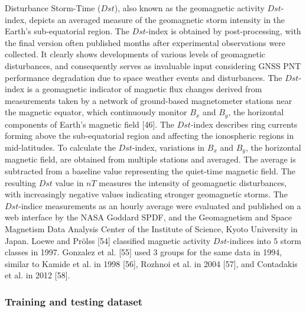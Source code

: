 \let\LaTeXcline\cline\documentclass[sn-mathphys-num]{sn-jnl}\let\cline\LaTeXcline
\begin{document}
Disturbance Storm-Time ($Dst$), also known as the geomagnetic activity $Dst$-index, depicts an averaged measure of the geomagnetic storm intensity in the Earth's sub-equatorial region. The $Dst$-index is obtained by post-processing, with the final version often published months after experimental observations were collected. It clearly shows developments of various levels of geomagnetic disturbances, and consequently serves as invaluable input considering GNSS PNT performance degradation due to space weather events and disturbances. The $Dst$-index is a geomagnetic indicator of magnetic flux changes derived from measurements taken by a network of ground-based magnetometer stations near the magnetic equator, which continuously monitor $B_{x}$ and $B_{y}$, the horizontal components of Earth's magnetic field [46]. The $Dst$-index describes ring currents forming above the sub-equatorial region and affecting the ionospheric regions in mid-latitudes. To calculate the $Dst$-index, variations in $B_{x}$ and $B_{y}$, the horizontal magnetic field, are obtained from multiple stations and averaged. The average is subtracted from a baseline value representing the quiet-time magnetic field. The resulting $Dst$ value in $nT$ measures the intensity of geomagnetic disturbances, with increasingly negative values indicating stronger geomagnetic storms. The $Dst$-indice measurements as an hourly average were evaluated and published on a web interface by the NASA Goddard SPDF, and the Geomagnetism and Space Magnetism Data Analysis Center of the Institute of Science, Kyoto University in Japan. Loewe and Prölss [54] classified magnetic activity $Dst$-indices into $5$ storm classes in 1997. Gonzalez et al. [55] used $3$ groups for the same data in 1994, similar to Kamide et al. in 1998 [56], Rozhnoi et al. in 2004 [57], and Contadakis et al. in 2012 [58].

\subsubsection{Training and testing dataset}
\end{document}
